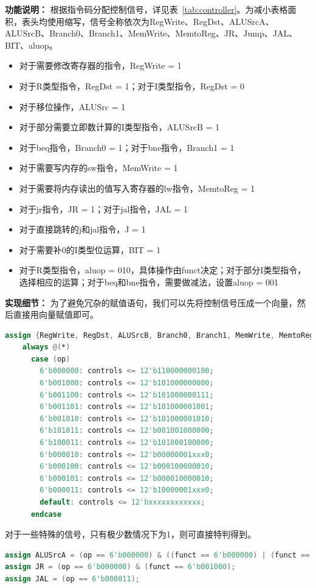 \documentclass[twocolumn]{article} %
\begin{document}
\begin{sloppypar}
{\bf 功能说明：} 根据指令码分配控制信号，详见表~\ref{tab:controller}。为减小表格面积，表头均使用缩写，信号全称依次为RegWrite、RegDst、ALUSrcA、ALUSrcB、Branch0、Branch1、MemWrite、MemtoReg、JR、Jump、JAL、BIT、aluop。

\begin{itemize}
\item 对于需要修改寄存器的指令，RegWrite = 1
\item 对于R类型指令，RegDst = 1；对于I类型指令，RegDst = 0
\item 对于移位操作，ALUSrc = 1
\item 对于部分需要立即数计算的I类型指令，ALUSrcB = 1
\item 对于beq指令，Branch0 = 1；对于bne指令，Branch1 = 1
\item 对于需要写内存的sw指令，MemWrite = 1
\item 对于需要将内存读出的值写入寄存器的lw指令，MemtoReg = 1
\item 对于jr指令，JR = 1；对于jal指令，JAL = 1
\item 对于直接跳转的j和jal指令，J = 1
\item 对于需要补0的I类型位运算，BIT = 1
\item 对于R类型指令，aluop = 010，具体操作由funct决定；对于部分I类型指令，选择相应的运算；对于beq和bne指令，需要做减法，设置aluop = 001
\end{itemize}

{\bf 实现细节：} 为了避免冗杂的赋值语句，我们可以先将控制信号压成一个向量，然后直接用向量赋值即可。
\begin{lstlisting}[language=Verilog]  
assign {RegWrite, RegDst, ALUSrcB, Branch0, Branch1, MemWrite, MemtoReg, Jump, aluop, BIT} = controls;
    always @(*)
      case (op)
        6'b000000: controls <= 12'b110000000100;
        6'b001000: controls <= 12'b101000000000;
        6'b001100: controls <= 12'b101000000111;
        6'b001101: controls <= 12'b101000001001;
        6'b001010: controls <= 12'b101000001010;
        6'b101011: controls <= 12'b001001000000;
        6'b100011: controls <= 12'b101000100000;
        6'b000010: controls <= 12'b00000001xxx0;
        6'b000100: controls <= 12'b000100000010;
        6'b000101: controls <= 12'b000010000010;
        6'b000011: controls <= 12'b10000001xxx0;
        default: controls <= 12'bxxxxxxxxxxxx;
      endcase
\end{lstlisting}  

对于一些特殊的信号，只有极少数情况下为1，则可直接特判得到。
\begin{lstlisting}[language=Verilog]  
assign ALUSrcA = (op == 6'b000000) & ((funct == 6'b000000) | (funct == 6'b000011) | (funct == 6'b000010));
assign JR = (op == 6'b000000) & (funct == 6'b001000);
assign JAL = (op == 6'b000011);
\end{lstlisting}  


\end{sloppypar}
\end{document}
